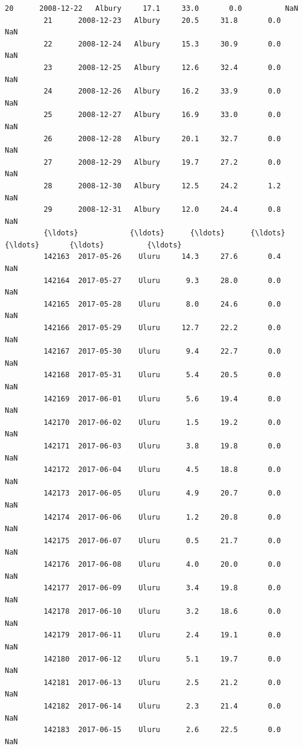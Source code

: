 \documentclass[11pt]{article}
\begin{document}
\begin{Verbatim}[commandchars=\\\{\}]
         20      2008-12-22   Albury     17.1     33.0       0.0          NaN   
         21      2008-12-23   Albury     20.5     31.8       0.0          NaN   
         22      2008-12-24   Albury     15.3     30.9       0.0          NaN   
         23      2008-12-25   Albury     12.6     32.4       0.0          NaN   
         24      2008-12-26   Albury     16.2     33.9       0.0          NaN   
         25      2008-12-27   Albury     16.9     33.0       0.0          NaN   
         26      2008-12-28   Albury     20.1     32.7       0.0          NaN   
         27      2008-12-29   Albury     19.7     27.2       0.0          NaN   
         28      2008-12-30   Albury     12.5     24.2       1.2          NaN   
         29      2008-12-31   Albury     12.0     24.4       0.8          NaN   
         {\ldots}            {\ldots}      {\ldots}      {\ldots}      {\ldots}       {\ldots}          {\ldots}   
         142163  2017-05-26    Uluru     14.3     27.6       0.4          NaN   
         142164  2017-05-27    Uluru      9.3     28.0       0.0          NaN   
         142165  2017-05-28    Uluru      8.0     24.6       0.0          NaN   
         142166  2017-05-29    Uluru     12.7     22.2       0.0          NaN   
         142167  2017-05-30    Uluru      9.4     22.7       0.0          NaN   
         142168  2017-05-31    Uluru      5.4     20.5       0.0          NaN   
         142169  2017-06-01    Uluru      5.6     19.4       0.0          NaN   
         142170  2017-06-02    Uluru      1.5     19.2       0.0          NaN   
         142171  2017-06-03    Uluru      3.8     19.8       0.0          NaN   
         142172  2017-06-04    Uluru      4.5     18.8       0.0          NaN   
         142173  2017-06-05    Uluru      4.9     20.7       0.0          NaN   
         142174  2017-06-06    Uluru      1.2     20.8       0.0          NaN   
         142175  2017-06-07    Uluru      0.5     21.7       0.0          NaN   
         142176  2017-06-08    Uluru      4.0     20.0       0.0          NaN   
         142177  2017-06-09    Uluru      3.4     19.8       0.0          NaN   
         142178  2017-06-10    Uluru      3.2     18.6       0.0          NaN   
         142179  2017-06-11    Uluru      2.4     19.1       0.0          NaN   
         142180  2017-06-12    Uluru      5.1     19.7       0.0          NaN   
         142181  2017-06-13    Uluru      2.5     21.2       0.0          NaN   
         142182  2017-06-14    Uluru      2.3     21.4       0.0          NaN   
         142183  2017-06-15    Uluru      2.6     22.5       0.0          NaN   

\end{Verbatim}
\end{document}
